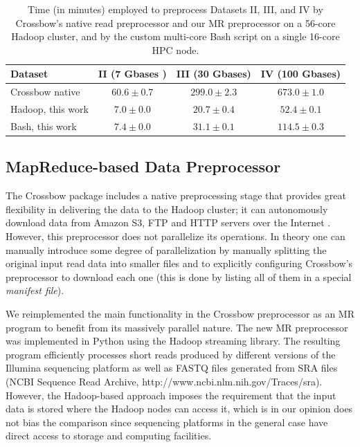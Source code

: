 \documentclass{bioinfo}
\begin{document}
\begin{methods}
\begin{table}[!ht]
\small
\caption{%
	Time (in minutes) employed to preprocess Datasets II, III, and IV by
	Crossbow's native read preprocessor and our MR preprocessor on a 56-core Hadoop
	cluster, and by the custom multi-core Bash script on a single 16-core HPC node.
	}

\begin{center}
\begin{tabular}{l|c|c|c}
Dataset			&		II (7 Gbases )	& III (30 Gbases)	& IV (100 Gbases)\\
\hline
Crossbow native			&		$60.6\pm0.7$	& $299.0\pm2.3$	&	$673.0\pm1.0$	\\
Hadoop, this work			&		$7.0\pm0.0$	&	$20.7\pm0.4$&		$52.4\pm0.1$\\
Bash, this work			& 		$7.4\pm0.0$	&	$31.1\pm0.1$	&	$114.5\pm0.3$	\\
\end{tabular}
\end{center}
\label{table:preprocess}
\normalsize
\end{table}%





\subsection*{MapReduce-based Data Preprocessor}
\label{sec:preprocessor}


The Crossbow package includes a native preprocessing stage that provides great
flexibility in delivering the data to the Hadoop cluster; it can autonomously
download data from Amazon S3, FTP and HTTP servers over the
Internet \citep{Langmead:2009kx}. However, this preprocessor does not parallelize
its operations. In theory one can manually introduce some degree of
parallelization by manually splitting the original input read data into smaller
files and to explicitly configuring Crossbow's preprocessor to download each one
(this is done by listing all of them in a special \textit{manifest file}).

We reimplemented the main functionality in the Crossbow preprocessor as an MR
program to benefit from its massively parallel nature. The new MR preprocessor
was implemented in Python using the Hadoop streaming library.
The resulting program efficiently processes short reads produced by different
versions of the Illumina sequencing platform as well as FASTQ files generated
from SRA files (NCBI Sequence Read Archive, http://www.ncbi.nlm.nih.gov/Traces/sra). However, the Hadoop-based approach imposes the requirement that the input data is stored
where the Hadoop nodes can access it, which is in our opinion does not bias the comparison since
sequencing platforms in the general case have direct access to storage and
computing facilities.




\end{methods}
\end{document}
